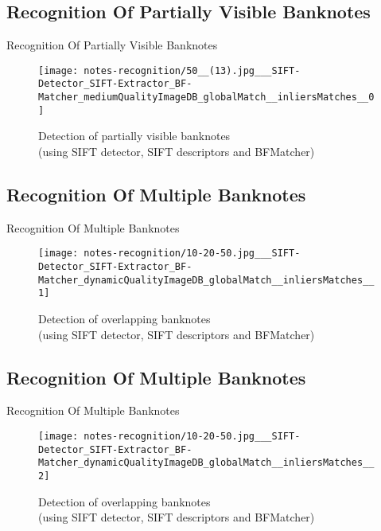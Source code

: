\subsection*{Recognition Of Partially Visible Banknotes}
\begin{frame}{Recognition Of Partially Visible Banknotes}
	\begin{figure}[H]
		\centering
		\texttt{[image: notes-recognition/50\_\_(13).jpg\_\_\_SIFT-Detector\_SIFT-Extractor\_BF-Matcher\_mediumQualityImageDB\_globalMatch\_\_inliersMatches\_\_0]}
		\caption{Detection of partially visible banknotes\\(using SIFT detector, SIFT descriptors and BFMatcher)}
		\label{fig:recognition-partially-visible}
	\end{figure}
\end{frame}


\subsection*{Recognition Of Multiple Banknotes}
\begin{frame}{Recognition Of Multiple Banknotes}
	\begin{figure}[H]
		\centering
		\texttt{[image: notes-recognition/10-20-50.jpg\_\_\_SIFT-Detector\_SIFT-Extractor\_BF-Matcher\_dynamicQualityImageDB\_globalMatch\_\_inliersMatches\_\_1]}
		\caption{Detection of overlapping banknotes\\(using SIFT detector, SIFT descriptors and BFMatcher)}
		\label{fig:recognition-overlapping-banknotes-1}
	\end{figure}
\end{frame}

\subsection*{Recognition Of Multiple Banknotes}
\begin{frame}{Recognition Of Multiple Banknotes}
	\begin{figure}[H]
		\centering
		\texttt{[image: notes-recognition/10-20-50.jpg\_\_\_SIFT-Detector\_SIFT-Extractor\_BF-Matcher\_dynamicQualityImageDB\_globalMatch\_\_inliersMatches\_\_2]}
		\caption{Detection of overlapping banknotes\\(using SIFT detector, SIFT descriptors and BFMatcher)}
		\label{fig:recognition-overlapping-banknotes-2}
	\end{figure}
\end{frame}


